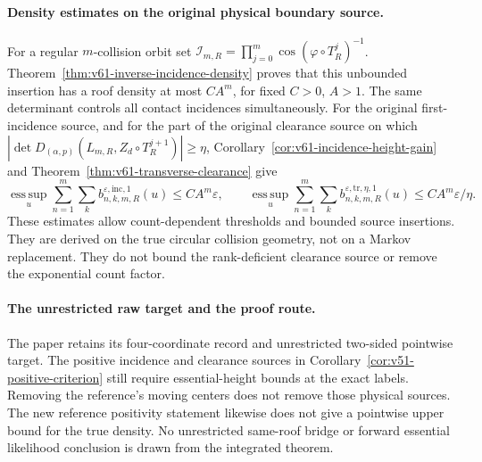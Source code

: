\paragraph{Density estimates on the original physical boundary source.}
For a regular $m$-collision orbit set
$\mathcal I_{m,R}=\prod_{j=0}^m\cos(\varphi\circ T_R^j)^{-1}$.
Theorem~\ref{thm:v61-inverse-incidence-density} proves that this unbounded
insertion has a roof density at most $CA^m$, for fixed $C>0$, $A>1$.
The same determinant controls all contact incidences simultaneously.
For the original first-incidence source, and for the part of the original
clearance source on which
$|\det D_{(\alpha,p)}(L_{m,R},Z_d\circ T_R^{j+1})|\ge\eta$,
Corollary~\ref{cor:v61-incidence-height-gain} and
Theorem~\ref{thm:v61-transverse-clearance} give
\[
 \operatorname*{ess\,sup}_u\sum_{n=1}^m\sum_k
 b^{\varepsilon,\mathrm{inc},1}_{n,k,m,R}(u)\le CA^m\varepsilon,
 \qquad
 \operatorname*{ess\,sup}_u\sum_{n=1}^m\sum_k
 b^{\varepsilon,\mathrm{tr},\eta,1}_{n,k,m,R}(u)
       \le CA^m\varepsilon/\eta.
\]
These estimates allow count-dependent thresholds and bounded source
insertions. They are derived on the true circular collision geometry,
not on a Markov replacement. They do not bound the rank-deficient
clearance source or remove the exponential count factor.

\paragraph{The unrestricted raw target and the proof route.}
The paper retains its four-coordinate record and unrestricted
two-sided pointwise target. The positive incidence and clearance
sources in Corollary~\ref{cor:v51-positive-criterion} still require
essential-height bounds at the exact labels. Removing the reference's
moving centers does not remove those physical sources. The new
reference positivity statement likewise does not give a pointwise
upper bound for the true density. No unrestricted same-roof bridge
or forward essential likelihood conclusion is drawn from the
integrated theorem.

